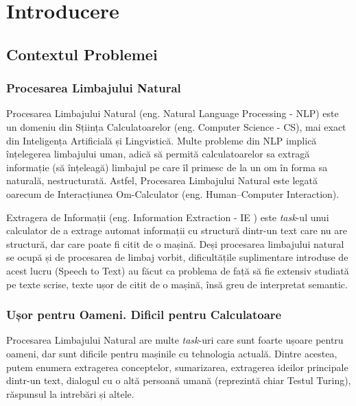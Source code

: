 \chapter{Introducere}
\label{chapter:intro}

\section{Contextul Problemei}

\subsection{Procesarea Limbajului Natural}


Procesarea Limbajului Natural (eng. Natural Language Processing - NLP) este un domeniu din Sțiința Calculatoarelor (eng. Computer Science - CS), mai exact din Inteligența Artificială și Lingvistică. Multe probleme din NLP implică înțelegerea limbajului uman, adică să permită calculatoarelor sa extragă informație (să înțeleagă) limbajul pe care îl primesc de la un om în forma sa naturală, nestructurată. Astfel, Procesarea Limbajului Natural este legată oarecum de Interacțiunea Om-Calculator (eng. Human–Computer Interaction).

Extragera de Informații (eng. Information Extraction - IE ) este \textit{task}-ul unui calculator de a extrage automat informații cu structură dintr-un text care nu are structură, dar care poate fi citit de o mașină. Deși procesarea limbajului natural se ocupă și de procesarea de limbaj vorbit, dificultățile suplimentare introduse de acest lucru (Speech to Text) au făcut ca problema de față să fie extensiv studiată pe texte scrise, texte ușor de citit de o mașină, însă greu de interpretat semantic.


\subsection{Ușor pentru Oameni. Dificil pentru Calculatoare}

Procesarea Limbajului Natural are multe \textit{task}-uri care sunt foarte ușoare pentru oameni, dar sunt dificile pentru mașinile cu tehnologia actuală. Dintre acestea, putem enumera extragerea conceptelor, sumarizarea, extragerea ideilor principale dintr-un text, dialogul cu o altă persoană umană (reprezintă chiar Testul Turing), răspunsul la intrebări și altele.

